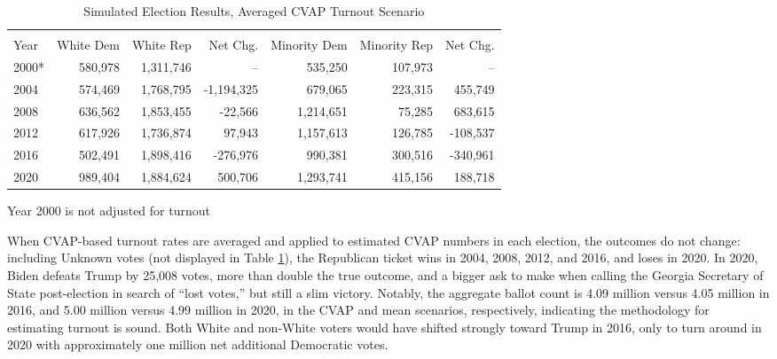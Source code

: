 \begin{table}[ht]
\centering
\begin{threeparttable}
\caption{Simulated Election Results, Averaged CVAP Turnout Scenario}
\label{tab:mid-cvap-to}
\begin{tabular}{lrrrrrr}
  \hline \\ \vspace{0.5em} 
Year & White Dem & White Rep & Net Chg. & Minority Dem  & Minority Rep  & Net Chg.\\ 
  \hline
  2000* & 580,978 & 1,311,746 &   -- & 535,250 & 107,973 &   -- \\ 
   2004 & 574,469 & 1,768,795 & -1,194,325 & 679,065 & 223,315 &  455,749 \\ 
  2008 & 636,562 & 1,853,455 & -22,566 & 1,214,651 & 75,285 & 683,615 \\ 
  2012 & 617,926 & 1,736,874 & 97,943 & 1,157,613 & 126,785 & -108,537 \\ 
  2016 & 502,491 & 1,898,416 & -276,976 & 990,381 & 300,516 & -340,961 \\ 
  2020 & 989,404 & 1,884,624 & 500,706 & 1,293,741 & 415,156 & 188,718\vspace{0.5em} \\ 
   \hline
\end{tabular}
{\footnotesize *Year 2000 is not adjusted for turnout}
\end{threeparttable}
\end{table}

When CVAP-based turnout rates are averaged and applied to estimated CVAP numbers in each election, the outcomes do not change: including Unknown votes (not displayed in Table \ref{tab:mid-cvap-to}), the Republican ticket wins in 2004, 2008, 2012, and 2016, and loses in 2020. In 2020, Biden defeats Trump by 25,008 votes, more than double the true outcome, and a bigger ask to make when calling the Georgia Secretary of State post-election in search of ``lost votes,'' but still a slim victory. Notably, the aggregate ballot count is 4.09 million versus 4.05 million in 2016, and 5.00 million versus 4.99 million in 2020, in the CVAP and mean scenarios, respectively, indicating the methodology for estimating turnout is sound. Both White and non-White voters would have shifted strongly toward Trump in 2016, only to turn around in 2020 with approximately one million net additional Democratic votes.    

